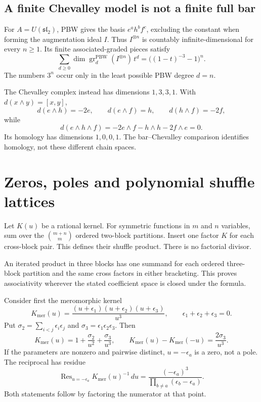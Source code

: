 \subsection{A finite Chevalley model is not a finite full bar}

For $A=U(\mathfrak{sl}_2)$, PBW gives the basis
$e^ah^bf^c$, excluding the constant when forming the augmentation
ideal $I$.
Thus $I^{\otimes n}$ is countably infinite-dimensional for every
$n\ge1$.
Its finite associated-graded pieces satisfy
\[
 \sum_{d\ge0}
 \dim\operatorname{gr}^{\mathrm{PBW}}_d(I^{\otimes n})\,t^d
 =\bigl((1-t)^{-3}-1\bigr)^n.
\]
The numbers $3^n$ occur only in the least possible PBW degree $d=n$.

The Chevalley complex instead has dimensions $1,3,3,1$.
With $d(x\wedge y)=[x,y]$,
\[
 d(e\wedge h)=-2e,\qquad
 d(e\wedge f)=h,\qquad
 d(h\wedge f)=-2f,
\]
while
\[
 d(e\wedge h\wedge f)
 =-2e\wedge f-h\wedge h-2f\wedge e=0.
\]
Its homology has dimensions $1,0,0,1$.
The bar--Chevalley comparison identifies homology, not these
different chain spaces.

\section{Zeros, poles and polynomial shuffle lattices}

Let $K(u)$ be a rational kernel.
For symmetric functions in $m$ and $n$ variables, sum over
the $\binom{m+n}{m}$ ordered two-block partitions.
Insert one factor $K$ for each cross-block pair.
This defines their shuffle product.
There is no factorial divisor.

An iterated product in three blocks has one summand for each ordered
three-block partition and the same cross factors in either bracketing.
This proves associativity wherever the stated coefficient space is
closed under the formula.

Consider first the meromorphic kernel
\[
 K_{\mathrm{mer}}(u)
 =\frac{(u+\epsilon_1)(u+\epsilon_2)(u+\epsilon_3)}{u^3},
 \qquad \epsilon_1+\epsilon_2+\epsilon_3=0.
\]
Put $\sigma_2=\sum_{i<j}\epsilon_i\epsilon_j$ and
$\sigma_3=\epsilon_1\epsilon_2\epsilon_3$.
Then
\begin{equation}\label{eq:vol2-shuffle-divisor}
 K_{\mathrm{mer}}(u)=1+\frac{\sigma_2}{u^2}
                         +\frac{\sigma_3}{u^3},
 \qquad
 K_{\mathrm{mer}}(u)-K_{\mathrm{mer}}(-u)
 =\frac{2\sigma_3}{u^3}.
\end{equation}
If the parameters are nonzero and pairwise distinct,
$u=-\epsilon_a$ is a zero, not a pole.
The reciprocal has residue
\begin{equation}\label{eq:vol2-shuffle-reciprocal}
 \operatorname{Res}_{u=-\epsilon_a}
    K_{\mathrm{mer}}(u)^{-1}\,du
 =\frac{(-\epsilon_a)^3}
        {\prod_{b\ne a}(\epsilon_b-\epsilon_a)}.
\end{equation}
Both statements follow by factoring the numerator at that point.

